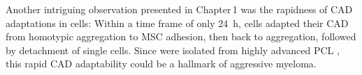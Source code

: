\unnsubsection{\caddadaptabilitytitle}%
\label{sec:discussion_caddadaptability}%
Another intriguing observation presented in Chapter\,1 was the rapidness of
\ac{CAD} adaptations in \INA cells: Within a time frame of only \SI{24}{\hour},
\INA cells adapted their \ac{CAD} from homotypic aggregation to \ac{MSC}
adhesion, then back to aggregation, followed by detachment of single cells.
Since \INA were isolated from highly advanced \ac{PCL}
\cite{burgerGp130RasMediated2001}, this rapid \ac{CAD} adaptability could be a
hallmark of aggressive myeloma.














